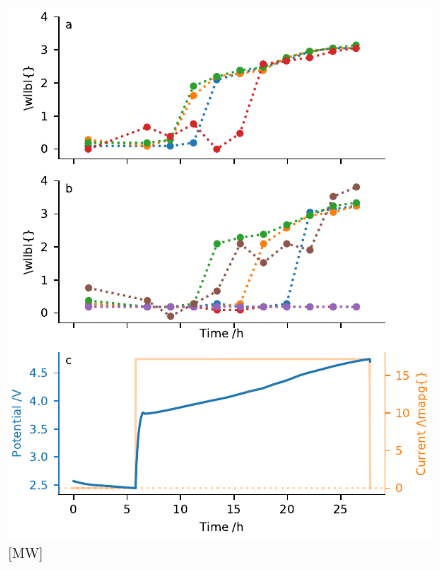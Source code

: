 \documentclass{article}
\begin{document}
\begin{figure}
  \includegraphics{figures/NCA-particles-irradiation.pdf}
  \caption{[MW] }
\end{figure}
\end{document}

